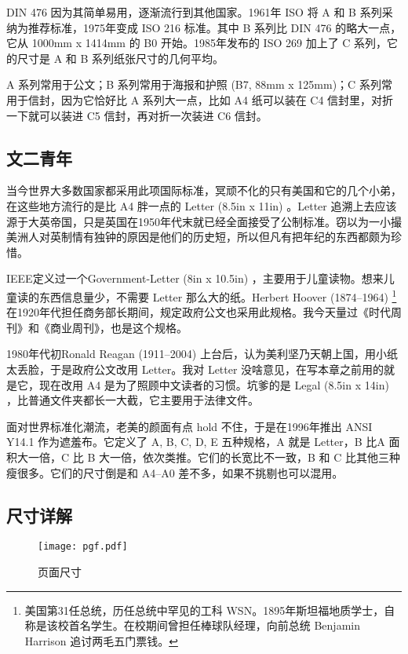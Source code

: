 DIN 476 因为其简单易用，逐渐流行到其他国家。1961年 ISO 将 A 和 B 系列采纳为推荐标准，1975年变成 ISO 216 标准。其中 B 系列比 DIN 476 的略大一点，它从 1000mm x 1414mm 的 B0 开始。1985年发布的 ISO 269 加上了 C 系列，它的尺寸是 A 和 B 系列纸张尺寸的几何平均。

A 系列常用于公文；B 系列常用于海报和护照 (B7, 88mm x 125mm)；C 系列常用于信封，因为它恰好比 A 系列大一点，比如 A4 纸可以装在 C4 信封里，对折一下就可以装进 C5 信封，再对折一次装进 C6 信封。

\subsection{文二青年}

当今世界大多数国家都采用此项国际标准，冥顽不化的只有美国和它的几个小弟，在这些地方流行的是比 A4 胖一点的 Letter (8.5in x 11in) 。Letter 追溯上去应该源于大英帝国，只是英国在1950年代末就已经全面接受了公制标准。窃以为一小撮美洲人对英制情有独钟的原因是他们的历史短，所以但凡有把年纪的东西都颇为珍惜。

IEEE\indexIEEE{}定义过一个Government-Letter (8in x 10.5in) ，主要用于儿童读物。想来儿童读的东西信息量少，不需要 Letter 那么大的纸。Herbert Hoover (1874--1964)\indexHoover{} \footnote{美国第31任总统，历任总统中罕见的工科 WSN。1895年斯坦福地质学士，自称是该校首名学生。在校期间曾担任棒球队经理，向前总统 Benjamin Harrison 追讨两毛五门票钱。} 在1920年代担任商务部长期间，规定政府公文也采用此规格。我今天量过《时代周刊》和《商业周刊》，也是这个规格。

1980年代初Ronald Reagan (1911--2004)\indexReagon{} 上台后，认为美利坚乃天朝上国，用小纸太丢脸，于是政府公文改用 Letter。我对 Letter 没啥意见，在写本章之前用的就是它，现在改用 A4 是为了照顾中文读者的习惯。坑爹的是 Legal (8.5in x 14in) ，比普通文件夹都长一大截，它主要用于法律文件。

面对世界标准化潮流，老美的颜面有点 hold 不住，于是在1996年推出 ANSI Y14.1 作为遮羞布。它定义了 A, B, C, D, E 五种规格，A 就是 Letter，B 比A 面积大一倍，C 比 B 大一倍，依次类推。它们的长宽比不一致，B 和 C 比其他三种瘦很多。它们的尺寸倒是和 A4--A0 差不多，如果不挑剔也可以混用。

\subsection{尺寸详解}

\begin{figure}[!htbp]
\centering
\texttt{[image: pgf.pdf]}
\caption{页面尺寸}
\label{fig:pagelayout}
\end{figure}

